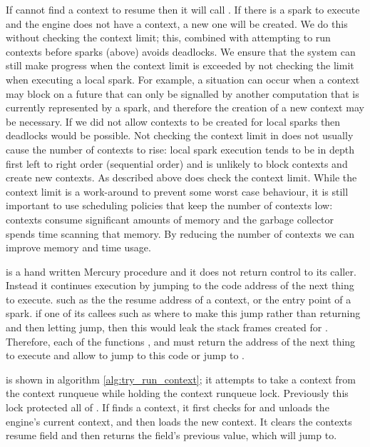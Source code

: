 If \idle cannot find a context to resume then it
will call \tryrunlocalspark.
If there is a spark to execute and the engine does not have a context,
a new one will be created.
We do this without checking the context limit;
this, combined with attempting to run contexts before sparks (above)
avoids deadlocks.
We ensure that the system can still make progress when the context limit is
exceeded by not checking the limit when executing a local spark.
For example,
a situation can occur when a context may block on
a future that can only be signalled by another computation that is currently
represented by a spark, and therefore the creation of a new context may be
necessary.
If we did not allow contexts to be created for local sparks then deadlocks
would be possible.
Not checking the context limit in \tryrunlocalspark does not usually cause
the number of contexts to rise:
local spark execution tends to be in depth first left to right order
(sequential order) and is unlikely to block contexts and create new
contexts.
As described above \trystealspark does check the context limit.
While the context limit is a work-around to prevent some worst case
behaviour,
it is still important to use scheduling policies that keep the number of
contexts low:
contexts consume significant amounts of memory and
the garbage collector spends time scanning that memory.
By reducing the number of contexts we can improve memory and time usage.

\idle is a hand written Mercury procedure and it does not return control to
its caller.
Instead it continues execution by jumping to the code address of the next
thing to execute.
such as the
the resume address of a context,
or the entry point of a spark.
if one of its callees such as \trystealspark where to make this jump rather
than returning and then letting \idle jump,
then this would leak the stack frames created for \trystealspark.
Therefore, each of the functions \tryrunlocalspark, \tryruncontext and
\trystealspark must return the address of the next thing to execute and
allow \idle to jump to this code or jump to \sleep.

\tryruncontext is shown in algorithm \ref{alg:try_run_context};
it attempts to take a context from the context runqueue while holding the
context runqueue lock.
Previously this lock protected all of \idle.
If \tryruncontext finds a context,
it first checks for and unloads the engine's current context,
and then loads the new context.
It clears the contexts resume field and then returns the field's previous
value, which \idle will jump to.

